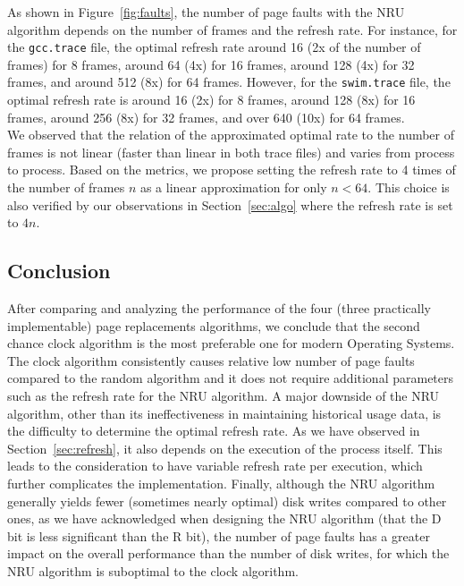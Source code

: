 \documentclass[letterpaper]{article}
\begin{document}
As shown in Figure~\ref{fig:faults}, the number of page faults with the NRU algorithm depends on the number of frames and the refresh rate. For instance, for the \texttt{gcc.trace} file, the optimal refresh rate around 16 (2x of the number of frames) for 8 frames, around 64 (4x) for 16 frames, around 128 (4x) for 32 frames, and around 512 (8x) for 64 frames. However, for the \texttt{swim.trace} file, the optimal refresh rate is around 16 (2x) for 8 frames, around 128 (8x) for 16 frames, around 256 (8x) for 32 frames, and over 640 (10x) for 64 frames.\\
We observed that the relation of the approximated optimal rate to the number of frames is not linear (faster than linear in both trace files) and varies from process to process. Based on the metrics, we propose setting the refresh rate to 4 times of the number of frames $n$ as a linear approximation for only $n<64$. This choice is also verified by our observations in Section~\ref{sec:algo} where the refresh rate is set to $4n.$
\subsection{Conclusion}
After comparing and analyzing the performance of the four (three practically implementable) page replacements algorithms, we conclude that the second chance clock algorithm is the most preferable one for modern Operating Systems. The clock algorithm consistently causes relative low number of page faults compared to the random algorithm and it does not require additional parameters such as the refresh rate for the NRU algorithm. A major downside of the NRU algorithm, other than its ineffectiveness in maintaining historical usage data, is the difficulty to determine the optimal refresh rate. As we have observed in Section~\ref{sec:refresh}, it also depends on the execution of the process itself. This leads to the consideration to have variable refresh rate per execution, which further complicates the implementation. Finally, although the NRU algorithm generally yields fewer (sometimes nearly optimal) disk writes compared to other ones, as we have acknowledged when designing the NRU algorithm (that the D bit is less significant than the R bit), the number of page faults has a greater impact on the overall performance than the number of disk writes, for which the NRU algorithm is suboptimal to the clock algorithm.

\label{LastPage}
\end{document}
